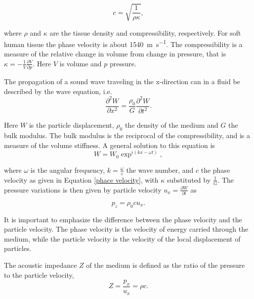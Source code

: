 \begin{equation}
\label{phace velocity}
c = \sqrt{\frac{1}{\rho \kappa}},
\end{equation}

where $\rho$ and $\kappa$ are the tissue density and compressibility, respectively. For soft human tissue the phase velocity is about \SI{1540}{\metre\per\second}.%
The compressibility is a measure of the relative change in volume from change in pressure, that is $\kappa = -\frac{1}{V}\frac{\partial V}{\partial p}$. Here $V$ is volume and $p$ pressure. 

The propagation of a sound wave traveling in the x-direction can in a fluid be described by the wave equation, i.e.
\begin{equation}
\label{wave equation}
\frac{\partial^2W}{\partial x^2} = \frac{\rho_0}{G}\frac{\partial^2W}{\partial t^2}.
\end{equation}

Here $W$ is the particle displacement, $\rho_0$ the density of the medium and $G$ the bulk modulus. The bulk modulus is the reciprocal of the compressibility, and is a measure of the volume stiffness. A general solution to this equation is 
\begin{equation}
\label{particle displacement}
W = W_0 \exp^{i(kx - \omega t)},
\end{equation}

where $\omega$ is the angular frequency, $k = \frac{\omega}{c}$ the wave number, and $c$ the phase velocity as given in Equation \eqref{phace velocity}, with $\kappa$ substituted by $\frac{1}{G}$. The pressure variations is then given by particle velocity $u_x = \frac{\partial W}{\partial t}$ as 

\begin{equation}
\label{pressure wave}
p_z = \rho_0 c u_x.
\end{equation}

It is important to emphasize the difference between the phase velocity and the particle velocity. The phase velocity is the velocity of energy carried through the medium, while the particle velocity is the velocity of the local displacement of particles.

The acoustic impedance $Z$ of the medium is defined as the ratio of the pressure to the particle velocity,
\begin{equation}
\label{acoustic impedance}
 Z = \frac{p_x}{u_x} = \rho c.
\end{equation}

